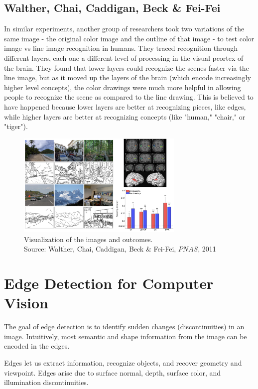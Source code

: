 \documentclass{article}
\begin{document}
\subsection{Walther, Chai, Caddigan, Beck \& Fei-Fei}
In similar experiments, another group of researchers took two variations of the same image - the original color image and the outline of that image - to test color image vs line image recognition in humans. They traced recognition through different layers, each one a different level of processing in the visual pcortex of the brain. They found that lower layers could recognize the scenes faster via the line image, but as it moved up the layers of the brain (which encode increasingly higher level concepts), the color drawings were much more helpful in allowing people to recognize the scene as compared to the line drawing. This is believed to have happened because lower layers are better at recognizing pieces, like edges, while higher layers are better at recognizing concepts (like "human," "chair," or "tiger").

\begin{figure}[H]
\centering
\includegraphics[width=8cm]{fei-fei_images.png}
\caption{Visualization of the images and outcomes. \\
Source: Walther, Chai, Caddigan, Beck \& Fei-Fei, $PNAS$, 2011}
\end{figure}



\section{Edge Detection for Computer Vision}
The goal of edge detection is to identify sudden changes (discontinuities) in an image. Intuitively, most semantic and shape information from the image can be encoded in the edges. \newline

Edges let us extract information, recognize objects, and recover geometry and viewpoint. Edges arise due to surface normal, depth, surface color, and illumination discontinuities. \newline
\end{document}
